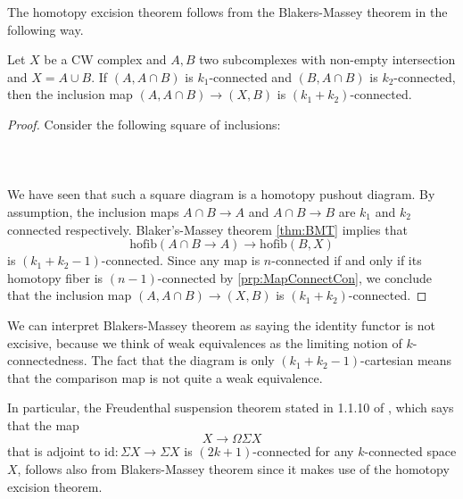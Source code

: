 The homotopy excision theorem follows from the Blakers-Massey theorem in the following way. 

\begin{crl}\label{crl:HET} Let $X$ be a CW complex and $A,B$ two subcomplexes with non-empty intersection and $X=A\cup B$. If $(A,A\cap B)$ is $k_1$-connected and $(B,A\cap B)$ is $k_2$-connected, then the inclusion map $(A,A\cap B)\to(X,B)$ is $(k_1+k_2)$-connected. 
\begin{proof}
Consider the following square of inclusions:  
 \\~\\  \\~\\
We have seen that such a square diagram is a homotopy pushout diagram. 
By assumption, the inclusion maps $A\cap B\to A$ and $A\cap B\to B$ are $k_1$ and $k_2$ connected respectively. Blaker's-Massey theorem \ref{thm:BMT} implies that $$\text{hofib}(A\cap B\to A)\to\text{hofib}(B,X)$$ is $(k_1+k_2-1)$-connected. Since any map is $n$-connected if and only if its homotopy fiber is $(n-1)$-connected by \ref{prp:MapConnectCon}, we conclude that the inclusion map $(A,A\cap B)\to(X,B)$ is $(k_1+k_2)$-connected. 
\end{proof}
\end{crl}

We can interpret Blakers-Massey theorem as saying the identity functor is not excisive, because we think of weak equivalences as the limiting notion of $k$-connectedness. The fact that the diagram is only $(k_1+k_2-1)$-cartesian means that the comparison map is not quite a weak equivalence. 

In particular, the Freudenthal suspension theorem stated in 1.1.10 of \cite{FSHT}, which says that the map $$X\to\Omega\Sigma X$$ that is adjoint to $\text{id}:\Sigma X\to\Sigma X$ is $(2k+1)$-connected for any $k$-connected space $X$, follows also from Blakers-Massey theorem since it makes use of the homotopy excision theorem. 

